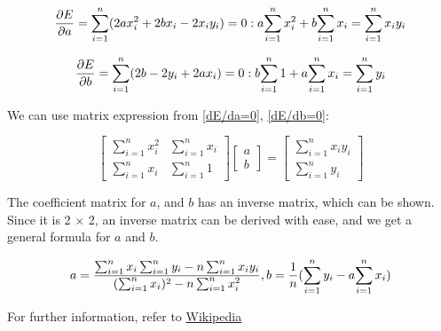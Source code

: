 \begin{equation}
    {{\partial E}\over{\partial a}} = 
    \sum_{i=1}^{n} (2ax_{i}^{2} + 2bx_{i} - 2x_{i}y_{i}) = 0 : a {\sum_{i=1}^{n} x_{i}^{2}} + b {\sum_{i=1}^{n} x_{i}} = {\sum_{i=1}^{n} x_{i}y_{i}}
    \label{dE/da=0}
\end{equation}

\begin{equation}
    {{\partial E}\over{\partial b}} = 
    \sum_{i=1}^{n} (2b - 2y_{i} + 2ax_{i}) = 0 : b {\sum_{i=1}^{n} 1} + a {\sum_{i=1}^{n} x_{i}} = {\sum_{i=1}^{n} y_{i}}
    \label{dE/db=0}
\end{equation}

We can use matrix expression from \ref{dE/da=0}, \ref{dE/db=0}:

\begin{equation}
    \begin{bmatrix}
    {\sum_{i=1}^{n} x_{i}^2} & {\sum_{i=1}^{n} x_{i}} \\
    {\sum_{i=1}^{n} x_{i}} & {\sum_{i=1}^{n} 1}
    \end{bmatrix}
    \begin{bmatrix}
        a \\ b
    \end{bmatrix}
    = 
    \begin{bmatrix}
        \sum_{i=1}^{n} x_{i}y_{i} \\
        {\sum_{i=1}^{n} y_{i}}
    \end{bmatrix}
    \label{matrix_eq}
\end{equation}

The coefficient matrix for $a$, and $b$ has an inverse matrix, which can be shown. Since it is 2 $\times$ 2, an inverse matrix can be derived with ease, and we get a general formula for $a$ and $b$.

\begin{equation}
    a = {{\sum_{i=1}^{n}x_{i} \sum_{i=1}^{n}y_{i} - n \sum_{i=1}^{n} x_{i}y_{i}}\over{(\sum_{i=1}^{n}x_{i})^{2} - n \sum_{i=1}^{n}x_{i}^{2}}}, 
    b = {{1}\over{n}} {({\sum_{i=1}^{n} y_{i}} - a {\sum_{i=1}^{n} x_{i}})}
    \label{a and b}
\end{equation}

For further information, refer to \href{https://en.wikipedia.org/wiki/Linear_regression}{Wikipedia}

